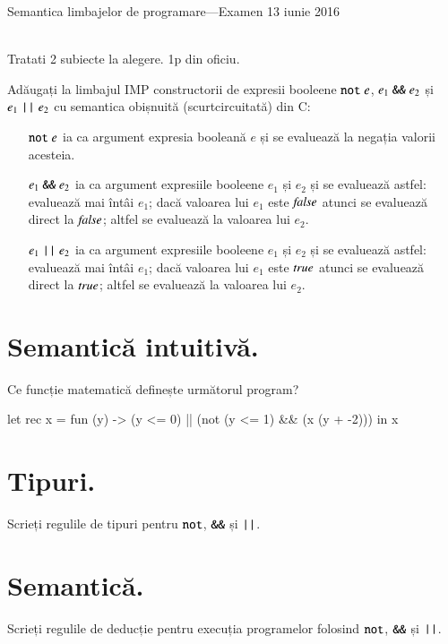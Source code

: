 \documentclass[addpoints,12pt,a4paper,answers]{exam}
\begin{document}
\begin{center}


Semantica limbajelor de programare---Examen \hfill  13 iunie 2016 \\ \ \\

\end{center}


Tratati 2 subiecte la alegere.  1p din oficiu.
\begin{questions}
Adăugați la limbajul IMP constructorii de expresii booleene $\mathrel{\text{\ttfamily not}} e$, $e_1 \mathrel{\text{\ttfamily \&\&}} e_2$ și $e_1 \mathrel{\text{\ttfamily ||}} e_2$ cu semantica obișnuită (scurtcircuitată) din C:
\begin{itemize}
  \item[$\mathrel{\text{\ttfamily not}} e$] ia ca argument expresia booleană $e$ și se evaluează la negația valorii acesteia.
  \item[$e_1 \mathrel{\text{\ttfamily \&\&}} e_2$] ia ca argument expresiile booleene $e_1$ și $e_2$ și se evaluează astfel: evaluează mai întâi $e_1$; dacă valoarea lui $e_1$ este ${\it false}$ atunci se evaluează direct la ${\it false}$; altfel se evaluează la valoarea lui $e_2$.
  \item[$e_1 \mathrel{\text{\ttfamily ||}} e_2$] ia ca argument expresiile booleene $e_1$ și $e_2$ și se evaluează astfel: evaluează mai întâi $e_1$; dacă valoarea lui $e_1$ este ${\it true}$ atunci se evaluează direct la ${\it true}$; altfel se evaluează la valoarea lui $e_2$.
\end{itemize}
\begin{parts}
\part[1] {\bf Semantică intuitivă. } Ce funcție matematică definește următorul program?%
\begin{asciiml}
let rec x =
  fun (y) -> (y <= 0) || (not (y <= 1) && (x (y + -2)))
in x
\end{asciiml}
\part[1] {\bf Tipuri. } Scrieți regulile de tipuri pentru $\mathrel{\text{\ttfamily not}}$, $\mathrel{\text{\ttfamily \&\&}}$ și $\mathrel{\text{\ttfamily ||}}$.
\part[1] {\bf Semantică. } Scrieți regulile de deducție pentru execuția programelor folosind $\mathrel{\text{\ttfamily not}}$, $\mathrel{\text{\ttfamily \&\&}}$ și $\mathrel{\text{\ttfamily ||}}$. 

\end{parts}
\end{questions}
\end{document}
